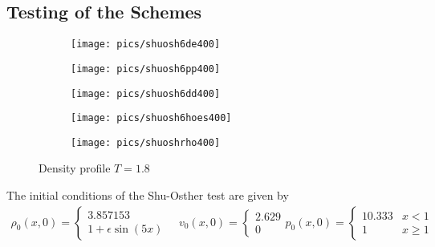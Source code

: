 	\subsection{Testing of the Schemes}
	\begin{figure}
		\centering
		\begin{subfigure}{0.48\textwidth}
			\texttt{[image: pics/shuosh6de400]}
		\end{subfigure}
		\begin{subfigure}{0.48\textwidth}
			\texttt{[image: pics/shuosh6pp400]}
		\end{subfigure}
		\begin{subfigure}{0.48\textwidth}
			\texttt{[image: pics/shuosh6dd400]}
		\end{subfigure}
		\begin{subfigure}{0.48\textwidth}
			\texttt{[image: pics/shuosh6hoes400]}
		\end{subfigure}
		\begin{subfigure}{0.48\textwidth}
			\texttt{[image: pics/shuoshrho400]}
		\end{subfigure}
		\caption{Density profile  $T = 1.8$}
		\label{fig:SO6}
	\end{figure}
The initial conditions of the Shu-Osther test are given by
	\begin{align*}
		\rho_0(x, 0) = \begin{cases}3.857153  \\ 1 + \epsilon \sin(5 x)  \end{cases} 
		\quad 
		v_0(x, 0) = \begin{cases} 2.629  \\ 0  \end{cases}
		p_0(x, 0) = \begin{cases} 10.333 & x < 1 \\ 1 & x \geq 1 \end{cases}
	\end{align*}

